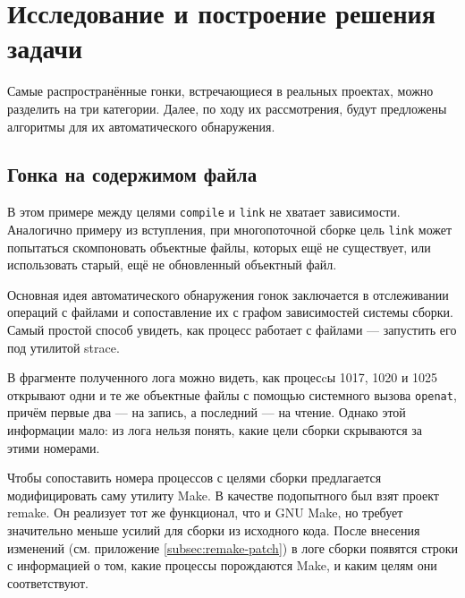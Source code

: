 \section{Исследование и построение решения задачи}
\label{sec:Chapter3} 


Самые распространённые гонки, встречающиеся в реальных проектах, можно разделить на три категории. Далее, по ходу их рассмотрения, будут предложены алгоритмы для их автоматического обнаружения.

\subsection{Гонка на содержимом файла}



В этом примере между целями \texttt{compile} и \texttt{link} не хватает зависимости. Аналогично примеру из вступления, при многопоточной сборке цель \texttt{link} может попытаться скомпоновать объектные файлы, которых ещё не существует, или использовать старый, ещё не обновленный объектный файл.

Основная идея автоматического обнаружения гонок заключается в отслеживании операций с файлами и сопоставление их с графом зависимостей системы сборки. Самый простой способ увидеть, как процесс работает с файлами --- запустить его под утилитой strace.



В фрагменте полученного лога можно видеть, как процесcы 1017, 1020 и 1025 открывают одни и те же объектные файлы с помощью системного вызова \texttt{openat}, причём первые два --- на запись, а последний --- на чтение. Однако этой информации мало: из лога нельзя понять, какие цели сборки скрываются за этими номерами.

Чтобы сопоставить номера процессов с целями сборки предлагается модифицировать саму утилиту Make. В качестве подопытного был взят проект remake. Он реализует тот же функционал, что и GNU Make, но требует значительно меньше усилий для сборки из исходного кода. После внесения изменений (см. приложение \ref{subsec:remake-patch}) в логе сборки появятся строки с информацией о том, какие процессы порождаются Make, и каким целям они соответствуют.

